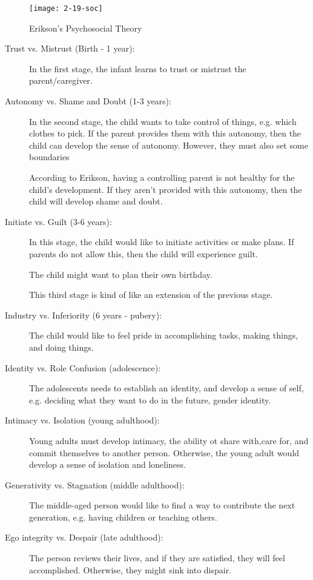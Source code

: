\documentclass[../main/main.tex]{subfiles}
\begin{document}
\begin{figure}[htpb]
  \centering
  \texttt{[image: 2-19-soc]}
  \caption{Erikson's Psychosocial Theory}
  \label{2-19-social}
\end{figure}
\begin{description}
  \item[Trust vs. Mistrust (Birth - 1 year):] In the first stage, the infant learns to trust or mistrust the parent/caregiver.
  \item[Autonomy vs. Shame and Doubt (1-3 years):] In the second stage, the child wants to take control of things, e.g. which clothes to pick. If the parent provides them with this autonomy, then the child can develop the sense of autonomy. However, they must also set some boundaries
        \begin{remark}
According to Erikson, having a controlling parent is not healthy for the child's development. If they aren't provided with this autonomy, then the child will develop shame and doubt.
        \end{remark}
        \item[Initiate vs. Guilt (3-6 years):] In this stage, the child would like to initiate activities or make plans. If parents do not allow this, then the child will experience guilt.
        \begin{example}
The child might want to plan their own birthday.
        \end{example}
        \begin{remark}
This third stage is kind of like an extension of the previous stage.
        \end{remark}
    \item[Industry vs. Inferiority (6 years - pubery):] The child would like to feel pride in accomplishing tasks, making things, and doing things.
    \item[Identity vs. Role Confusion (adolescence):] The adolescents needs to establish an identity, and develop a sense of self, e.g. deciding what they want to do in the future, gender identity.
    \item[Intimacy vs. Isolation (young adulthood):] Young adults must develop intimacy, the ability ot share with,care for, and commit themselves to another person. Otherwise, the young adult would develop a sense of isolation and loneliness.
    \item[Generativity vs. Stagnation (middle adulthood):] The middle-aged person would like to find a way to contribute the next generation, e.g. having children or teaching others.
    \item[Ego integrity vs. Despair (late adulthood):] The person reviews their lives, and if they are satisfied, they will feel accomplished. Otherwise, they might sink into dispair.
\end{description}
\end{document}
